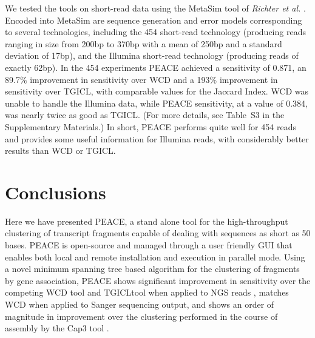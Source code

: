\documentclass[a4,center,fleqn]{NAR}
\newcommand{\mc}[1]{#1}
\newcommand{\peace} {{\small PEACE}}
\newcommand{\wcd} {{\small WCD}}
\newcommand{\capthree} {{\small Cap3}}
\newcommand{\metasim} {{\small MetaSim}}
\newcommand{\tgicl} {{\small TGICL}}
\begin{document}

We tested the tools on short-read data using the \metasim\/ tool
of {\it Richter et al.} \cite{Richter2008}.  Encoded into \metasim\/
are sequence generation and error models corresponding to several
technologies, including the 454 short-read technology (producing reads
ranging in size from 200bp to 370bp with a mean of 250bp and a
standard deviation of 17bp), and the Illumina short-read technology
(producing reads of exactly 62bp).  In the 454 experiments \peace\/
achieved a sensitivity of 0.871, an 89.7\% improvement in sensitivity
over \wcd\/ and a 193\% improvement in sensitivity over \tgicl, with
comparable values for the Jaccard Index.  \wcd\/ was unable to handle
the Illumina data, while \peace\/ sensitivity, at a value of 0.384,
was nearly twice as good as TGICL.  (For more details, see Table~S3
in the Supplementary Materials.)  In short, \peace\/ performs quite
well for 454 reads and provides some useful information for Illumina
reads, with considerably better results than \wcd\/ or \tgicl\/.

\section{Conclusions}

Here we have presented \peace, a stand alone tool for the
high-throughput clustering of transcript fragments capable of dealing
with sequences as short as 50 bases.  \peace\/ is open-source and
managed through a user friendly GUI that enables both local and remote
installation and execution in parallel mode.  Using a novel minimum
spanning tree based algorithm for the clustering of fragments by gene
association, \peace\/ shows significant improvement in sensitivity
over the competing \wcd\/ tool and \tgicl tool when applied to NGS
reads \cite{Hazelhurst08a,Pertea2003}, matches \wcd\/ when applied to
Sanger sequencing output, and shows an order of magnitude in
improvement over the clustering performed in the course of assembly by
the \capthree\/ tool \cite{Huang99}.
\end{document}

